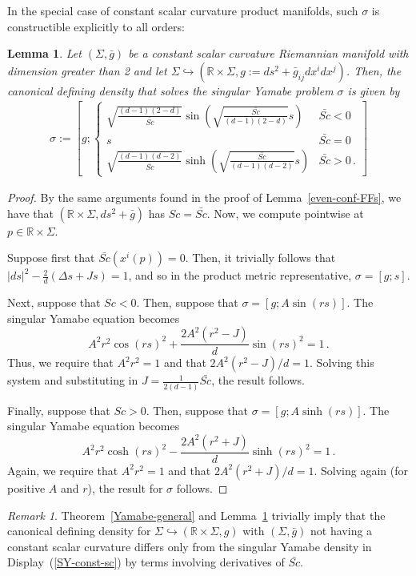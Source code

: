 \documentclass[a4paper,10.9pt]{amsart}
\newtheorem{lemma}[theorem]{Lemma}
\theoremstyle{definition}
\theoremstyle{remark}
\newtheorem{remark}[theorem]{Remark}
\numberwithin{equation}{section}
\renewcommand{\=}{\stackrel \Sigma =}
\begin{document}
In the special case of constant scalar curvature product manifolds, such $\sigma$ is constructible explicitly 
to all orders:
\begin{lemma} \label{Yamabe-soln}
Let $(\Sigma,\bar{g})$ be a constant scalar curvature Riemannian manifold with dimension greater than 2 and let $\Sigma \hookrightarrow (\mathbb{R} \times \Sigma,g:= ds^2 + \bar{g}_{ij} dx^i dx^j)$. Then, the canonical defining density that solves the singular Yamabe problem $\sigma$ is given by
\begin{align} \label{SY-const-sc}
\sigma := \left[g;  \begin{cases}
\sqrt{\tfrac{(d-1)(2-d)}{\bar{Sc}}} \sin\left(\sqrt{\tfrac{\bar{Sc}}{(d-1)(2-d)}} s\right) & \bar{Sc} < 0 \\
 s  & \bar{Sc}= 0 \\
 \sqrt{\tfrac{(d-1)(d-2)}{\bar{Sc}}} \sinh \left(\sqrt{\tfrac{\bar{Sc}}{(d-1)(d-2)}} s \right)  & \bar{Sc} > 0\,.
\end{cases} \right]
\end{align}
\end{lemma}
\begin{proof}
By the same arguments found in the proof of Lemma~\ref{even-conf-FFs}, we have that $(\mathbb{R} \times \Sigma,ds^2 + \bar{g})$ has $Sc = \bar{Sc}$. Now, we compute pointwise at $p \in \mathbb{R} \times \Sigma$.

Suppose first that $\bar{Sc}(x^i(p)) = 0$. Then, it trivially follows that $|ds|^2 - \tfrac{2}{d}(\Delta s + Js) = 1$, and so in the product metric representative, $\sigma = [g; s]$.

Next, suppose that $Sc < 0$. Then, suppose that $\sigma = [g; A \sin (rs)]$. The singular Yamabe equation becomes
$$A^2 r^2 \cos (rs)^2 + \frac{2A^2(r^2 - J)}{d} \sin(rs)^2 = 1\,.$$
Thus, we require that $A^2 r^2 = 1$ and that $2A^2 (r^2 - J)/d = 1$. Solving this system and substituting in $J = \tfrac{1}{2(d-1)} \bar{Sc}$, the result follows.

Finally, suppose that $Sc > 0$. Then, suppose that $\sigma = [g; A \sinh (rs)]$. The singular Yamabe equation becomes
$$A^2 r^2 \cosh (rs)^2 - \frac{2A^2(r^2 + J)}{d} \sinh(rs)^2 = 1\,.$$
Again, we require that $A^2 r^2 = 1$ and that $2A^2 (r^2 + J)/d = 1$. Solving again (for positive $A$ and $r$), the result for $\sigma$ follows.
\end{proof}

\begin{remark} \label{nonconst-Sc}
Theorem~\ref{Yamabe-general} and Lemma~\ref{Yamabe-soln} trivially imply that the canonical defining density for $\Sigma \hookrightarrow (\mathbb{R} \times \Sigma,g)$ with $(\Sigma, \bar{g})$ not having a constant scalar curvature differs only from the singular Yamabe density in Display~(\ref{SY-const-sc}) by terms involving derivatives of $\bar{Sc}$.
\end{remark}
\end{document}

